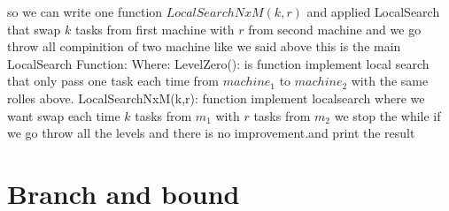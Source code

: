 \documentclass[11pt,fullpage]{article}
\begin{document}
so we can write one function $LocalSearchNxM(k,r)$ and applied LocalSearch that swap $k$ tasks from first machine with $r$ from second machine  and we go throw all compinition of two machine like we said above \newline
this is the main LocalSearch Function:\newline
Where: \newline
LevelZero(): is function implement local search that only pass one task each time from $machine_1$ to $machine_2$ with the same rolles above.\newline
 LocalSearchNxM(k,r): function implement localsearch where we want swap each time $k$ tasks from $m_1$ with $r$ tasks from $m_2$ \newline
we stop the while if we go throw all the levels and there is no improvement.and print the result
 

\section{Branch and bound}

 

\end{document}

